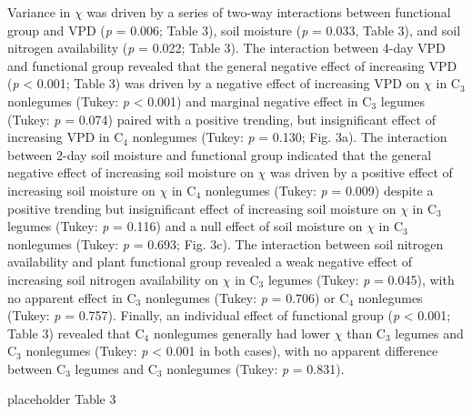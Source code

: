 Variance in $\chi$ was driven by a series of two-way interactions between functional group and VPD (\textit{p} = 0.006; Table 3), soil moisture (\textit{p} = 0.033, Table 3), and soil nitrogen availability (\textit{p} = 0.022; Table 3). The interaction between 4-day VPD and functional group revealed that the general negative effect of increasing VPD (\textit{p} < 0.001; Table 3) was driven by a negative effect of increasing VPD on $\chi$ in C$_3$ nonlegumes (Tukey: \textit{p} < 0.001) and marginal negative effect in C$_3$ legumes (Tukey: \textit{p} = 0.074) paired with a positive trending, but insignificant effect of increasing VPD in C$_4$ nonlegumes (Tukey: \textit{p} = 0.130; Fig. 3a). The interaction between 2-day soil moisture and functional group indicated that the general negative effect of increasing soil moisture on $\chi$ was driven by a positive effect of increasing soil moisture on $\chi$ in C$_4$ nonlegumes (Tukey: \textit{p} = 0.009) despite a positive trending but insignificant effect of increasing soil moisture on $\chi$ in C$_3$ legumes (Tukey: \textit{p} = 0.116) and a null effect of soil moisture on $\chi$ in C$_3$ nonlegumes (Tukey: \textit{p} = 0.693; Fig. 3c). The interaction between soil nitrogen availability and plant functional group revealed a weak negative effect of increasing soil nitrogen availability on $\chi$ in C$_3$ legumes (Tukey: \textit{p} = 0.045), with no apparent effect in C$_3$ nonlegumes (Tukey: \textit{p} = 0.706) or C$_4$ nonlegumes (Tukey: \textit{p} = 0.757). Finally, an individual effect of functional group (\textit{p} < 0.001; Table 3) revealed that C$_4$ nonlegumes generally had lower $\chi$ than C$_3$ legumes and C$_3$ nonlegumes (Tukey: \textit{p} < 0.001 in both cases), with no apparent difference between C$_3$ legumes and C$_3$ nonlegumes (Tukey: \textit{p} = 0.831).

\newpage
placeholder Table 3
\clearpage

